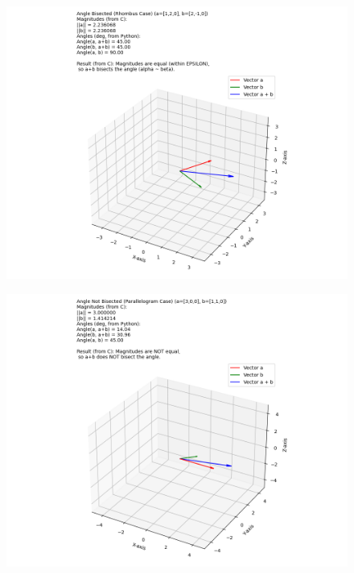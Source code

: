 \documentclass[journal]{IEEEtran}
\begin{document}
	
	
	\begin{figure}[H]
		\centering
		\includegraphics[width = 0.6\columnwidth]{Figure_1.png}
		\caption*{}
		\label{fig1}
	\end{figure}
	\begin{figure}[H]
		\centering
		\includegraphics[width = 0.6\columnwidth]{Figure_2.png}
		\caption*{}
		\label{fig2}
	\end{figure}
	
	
\end{document}
